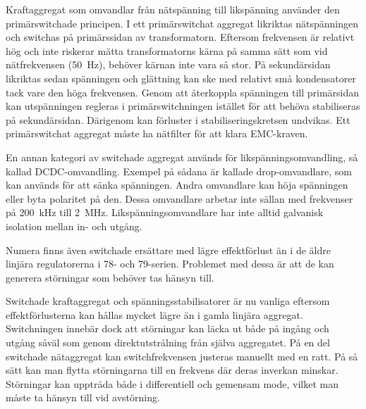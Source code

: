 Kraftaggregat som omvandlar från nätspänning till likspänning använder
den primärswitchade principen.
I ett primärswitchat aggregat likriktas nätspänningen och switchas på
primärssidan av transformatorn.
Eftersom frekvensen är relativt hög och inte riskerar mätta transformatorns
kärna på samma sätt som vid nätfrekvensen (\SI{50}{\hertz}), behöver kärnan
inte vara så stor.
På sekundärsidan likriktas sedan spänningen och glättning kan ske med relativt
små kondensatorer tack vare den höga frekvensen.
Genom att återkoppla spänningen till primärsidan kan utspänningen regleras i
primärswitchningen istället för att behöva stabiliseras på
sekundärsidan. Därigenom kan förluster i stabiliseringskretsen undvikas.
Ett primärswitchat aggregat måste ha nätfilter för att klara EMC-kraven.

En annan kategori av switchade aggregat används för likspänningsomvandling, så kallad DCDC-om\-vand\-ling.
Exempel på sådana är kallade drop-omvandlare, som kan används för att sänka spänningen.
Andra omvandlare kan höja spänningen eller byta polaritet på den.
Dessa omvandlare arbetar inte sällan med frekvenser på \SI{200}{\kilo\hertz}
till \SI{2}{\mega\hertz}.
Likspänningsomvandlare har inte alltid galvanisk isolation mellan in- och utgång.

Numera finns även switchade ersättare med lägre effektförlust än i de äldre linjära regulatorerna i 78- och 79-serien.
Problemet med dessa är att de kan generera störningar som behöver tas hänsyn till.

Switchade kraftaggregat och spänningsstabilisatorer är nu vanliga eftersom
effektförlusterna kan hållas mycket lägre än i gamla linjära aggregat.
Switchningen innebär dock att störningar kan läcka ut både på ingång och utgång
såväl som genom direktutstrålning från själva aggregatet.
På en del switchade nätaggregat kan switchfrekvensen justeras manuellt med en ratt. På så sätt kan man flytta störningarna till en frekvens där deras inverkan minskar.
Störningar kan uppträda både i differentiell och gemensam mode, vilket man måste ta hänsyn till vid avstörning.
